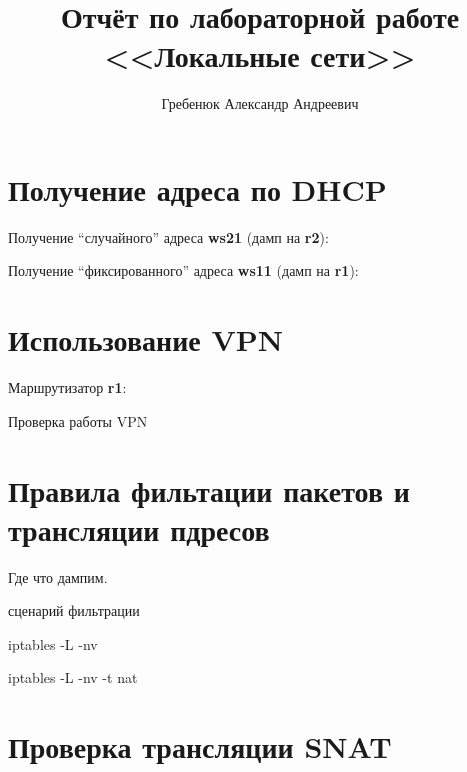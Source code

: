\documentclass[a4paper,12pt]{article}
\title{Отчёт по лабораторной работе \\ <<Локальные сети>>}
\author{Гребенюк Александр Андреевич}
\begin{document}
\maketitle

\tableofcontents


\clearpage
\section{Получение адреса по DHCP}

Получение ``случайного'' адреса \textbf{ws21} (дамп на \textbf{r2}):

Получение ``фиксированного'' адреса \textbf{ws11} (дамп на \textbf{r1}):


\clearpage
\section{Использование VPN}

Маршрутизатор \textbf{r1}:



Проверка работы VPN



\clearpage
\section{Правила фильтации пакетов и трансляции пдресов}

Где что дампим. 

сценарий фильтрации

iptables -L -nv

iptables -L -nv -t nat


\clearpage
\section{Проверка трансляции SNAT}
\end{document}
